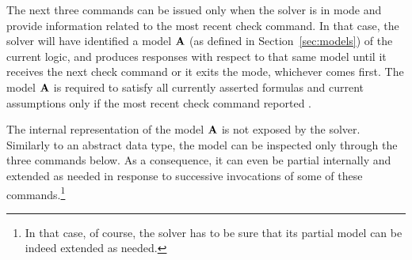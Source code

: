 The next three commands can be issued only when the solver is 
in  mode and provide information related 
to the most recent check command.
In that case, the solver will have identified a model $\mathbf{A}$ 
(as defined in Section~\ref{sec:models}) of the current logic,
and produces responses with respect to that same model until 
it receives the next check command or it exits the  mode,
whichever comes first.
The model $\mathbf{A}$ is required to satisfy all currently asserted formulas 
and current assumptions only if the most recent check command
reported .

The internal representation of the model $\mathbf{A}$ is not exposed by the solver.
Similarly to an abstract data type, the model can be inspected only 
through the three commands below.
As a consequence, it can even be partial internally and extended as needed 
in response to successive invocations of some of these commands.\footnote{%
In that case, of course, the solver has to be sure 
that its partial model can be indeed extended as needed.
}

